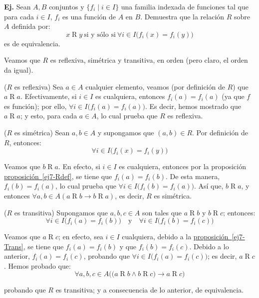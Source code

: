 \documentclass[letterpaper,DIV=14,headsepline,12pt]{scrartcl}
\makeatletter
\newcommand{\customRef}[2]{\hyperref[#1]{#2~\ref*{#1}}}
\providecommand\st{\;|\;}
\newcounter{Ejer}
\newcommand{\pts}{}
\newenvironment{ejercicio}[1]{\noindent
    \ifthenelse{\equal{#1}{1} \OR \equal{#1}{+1}}{\renewcommand{\pts}{\textbf{(#1 pt)}}}{\renewcommand{\pts}{\textbf{(#1 pts)}}}\textbf{Ej. \theEjer} \pts\stepcounter{Ejer}}{\vspace{.3cm}}
\renewenvironment{proof}[1][]{%
        \par\pushQED{\qed}%
        \normalfont\topsep6pt \partopsep0pt %
        \trivlist
        \item[\hskip\labelsep
                \textbf{\textit{Demostración.}}%
        ]#1
        }{%
        \popQED\endtrivlist\@endpefalse
    }
\makeatother
\begin{document}
    \begin{ejercicio}{1}\label{ej-7}
        Sean $A,B$ conjuntos y $\{f_i \st i\in I\}$ una familia indexada de funciones tal que para cada $i \in I$, $f_i$ es una función de $A$ en $B$. Demuestra que la relación $R$ sobre $A$ definida por:
        \[ x \mathrel{R} y \: \text{si y sólo si} \: \forall i \in I \big( f_i(x)=f_i(y) \big) \]
        es de equivalencia.
    \end{ejercicio}
    \begin{proof}
        Veamos que $R$ es reflexiva, simétrica y transitiva, en orden (pero claro, el orden da igual).

        ($R$ es reflexiva) Sea $a \in A$ cualquier elemento, veamos (por definición de $R$) que $a \mathrel{R} a$. Efectivamente, si $i \in I$ es cualquiera, entonces $f_i(a)=f_i(a)$ (ya que $f$ es función); por ello, $\forall i \in I \big( f_i(a)=f_i(a) \big)$. Es decir, hemos mostrado que $a \mathrel{R} a$; y esto, para cada $a \in A$, lo cual prueba que $R$ es reflexiva.

        ($R$ es simétrica) Sean $a,b \in A$ y supongamos que $(a,b) \in R$. Por definición de $R$, entonces:
        \begin{equation}\label{ej7-Rdef}
            \forall i \in I \big( f_i(x)=f_i(y) \big)
        \end{equation}

        Veamos que $b \mathrel{R} a$. En efecto, si $i \in I$ es cualquiera, entonces por la proposición \customRef{ej7-Rdef}{proposición}, se tiene que $f_i(a)=f_i(b)$. De esta manera, $f_i(b)=f_i(a)$, lo cual prueba que $\forall i \in I \big( f_i(b)=f_i(a) \big)$. Así que, $b \mathrel{R} a$, y entonces $\forall a,b \in A (a \mathrel{R} b \to b \mathrel{R} a)$, es decir, $R$ es simétrica.

        ($R$ es transitiva) Supongamos que $a,b,c \in A$ son tales que $a \mathrel{R} b$ y $b \mathrel{R} c$; entonces:
        \begin{equation}\label{ej7-Trans}
            \forall i \in I \big( f_i(a)=f_i(b) \big) \quad \text{y} \quad \forall i \in I \big( f_i(b)=f_i(c) \big)
        \end{equation}

        Veamos que $a \mathrel{R} c$; en efecto, sea $i \in I$ cualquiera, debido a la \customRef{ej7-Trans}{proposición}, se tiene que $f_i(a)=f_i(b)$ y que $f_i(b)=f_i(c)$. Debido a lo anterior, $f_i(a)=f_i(c)$, probando que $\forall i \in I \big( f_i(a)=f_i(c) \big)$; es decir, $a \mathrel{R} c$. Hemos probado que:
        \[ \forall a,b,c \in A \Big( \big( a \mathrel{R} b \land b \mathrel{R} c \big) \to a \mathrel{R} c \Big) \]

        probando que $R$ es transitiva; y a consecuencia de lo anterior, de equivalencia.
    \end{proof}
\end{document}
